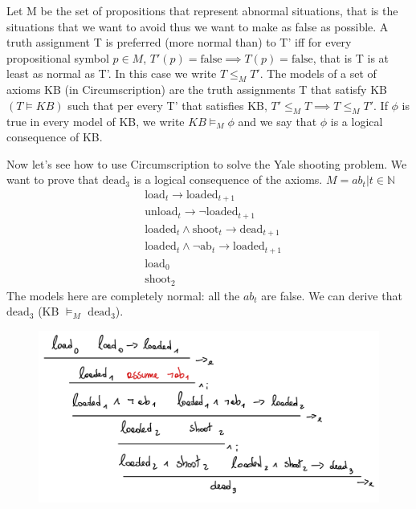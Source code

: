 \begin{defbox}[Circumscription]
Let M be the set of propositions that represent abnormal situations, that is the situations that we want to avoid thus we want to make as false as possible. A truth assignment T is preferred (more normal than) to T' iff for every propositional symbol $p\in M$, $T'(p)=\text{false}\implies T(p)=\text{false}$, that is T is at least as normal as T'. In this case we write $T\leq_M T'$. The models of a set of axioms KB (in Circumscription) are the truth assignments T that satisfy KB $(T\vDash KB)$ such that per every T' that satisfies KB, $T'\leq_M T\implies T\le_M T'$. If $\phi$ is true in every model of KB, we write $KB\vDash_M \phi$ and we say that $\phi$ is a logical consequence of KB.\\
\end{defbox}
Now let's see how to use Circumscription to solve the Yale shooting problem. We want to prove that $\text{dead}_3$ is a logical consequence of the axioms. $M={ab_t | t\in\mathbb{N}}$
\begin{align*}
    &\text{load}_t\to \text{loaded}_{t+1}\\
    &\text{unload}_t\to \neg \text{loaded}_{t+1}\\
    &\text{loaded}_t\land \text{shoot}_t\to \text{dead}_{t+1}\\
    &\text{loaded}_t\land\neg\text{ab}_t\to \text{loaded}_{t+1}\\
    &\text{load}_0 \\
    &\text{shoot}_2
\end{align*}
The models here are completely normal: all the $ab_t$ are false. We can derive that $\text{dead}_3$ (KB $\vDash_M$ $\text{dead}_3$).
\begin{figure}[h]
    \centering
    \includegraphics[width=1\textwidth]{img/ysp2.jpeg}
\end{figure}
\\
